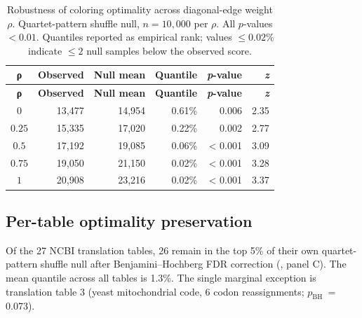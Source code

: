 \documentclass[preprint,11pt,authoryear,a4paper]{elsarticle}
\begin{document}
\begin{longtable}[]{@{}crrrrr@{}}
\caption{Robustness of coloring optimality across diagonal-edge weight
\(\rho\). Quartet-pattern shuffle null, \(n = 10,000\) per \(\rho\). All
\(p\)-values \(< 0.01\). Quantiles reported as empirical rank; values
\(\leq 0.02\%\) indicate \(\leq 2\) null samples below the observed
score.}\tabularnewline
\toprule\noalign{}
\textbf{ρ} & \textbf{Observed} & \textbf{Null mean} & \textbf{Quantile}
& \textbf{\emph{p}-value} & \textbf{\emph{z}} \\
\midrule\noalign{}
\endfirsthead
\toprule\noalign{}
\textbf{ρ} & \textbf{Observed} & \textbf{Null mean} & \textbf{Quantile}
& \textbf{\emph{p}-value} & \textbf{\emph{z}} \\
\midrule\noalign{}
\endhead
\bottomrule\noalign{}
\endlastfoot
\(0\) & 13,477 & 14,954 & 0.61\% & 0.006 & 2.35 \\
\(0.25\) & 15,335 & 17,020 & 0.22\% & 0.002 & 2.77 \\
\(0.5\) & 17,192 & 19,085 & 0.06\% & \textless{} 0.001 & 3.09 \\
\(0.75\) & 19,050 & 21,150 & 0.02\% & \textless{} 0.001 & 3.28 \\
\(1\) & 20,908 & 23,216 & 0.02\% & \textless{} 0.001 & 3.37 \\
\end{longtable}

\protect{}\label{tbl:rho}{}

\subsection{Per-table optimality preservation}\label{sec:res-pertable}

Of the 27 NCBI translation tables, 26 remain in the top 5\% of their own
quartet-pattern shuffle null after Benjamini--Hochberg FDR correction
(, panel C). The mean quantile across all tables is
1.3\%. The single marginal exception is translation table 3 (yeast
mitochondrial code, 6 codon reassignments; \(p_{\text{BH }} =\)0.073).
\end{document}
